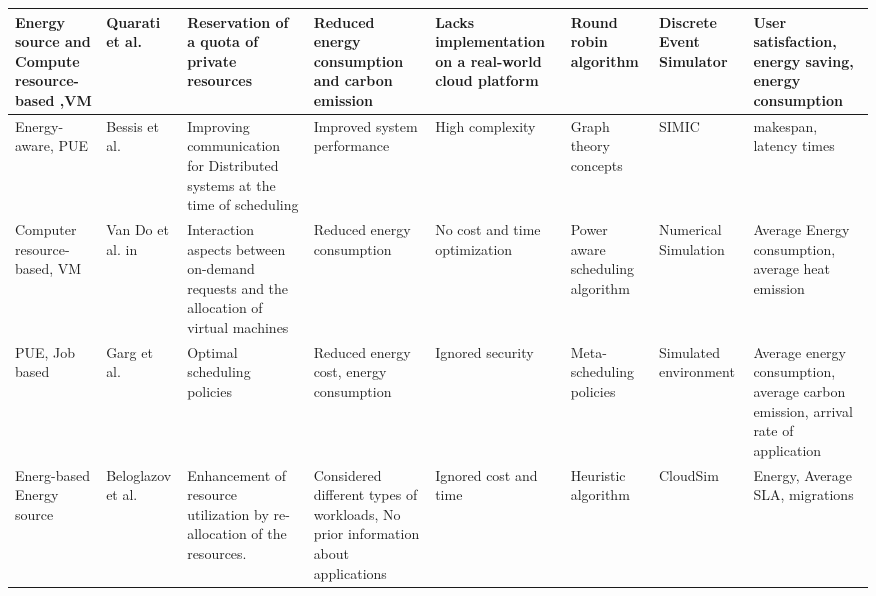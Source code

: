 \begin{sidewaystable*}[!htbp]
{\begin{tabular}{|g{2cm} p{1.5cm} p{2cm} p{2cm} p{2cm} p{2cm} p{2cm} p{2cm}|}
Energy source and  Compute resource-based ,VM  & Quarati et al.~\cite{quarati2013hybrid} &  Reservation of a quota of private resources & Reduced energy consumption and carbon emission & Lacks implementation on a real-world cloud platform & Round robin algorithm & Discrete Event Simulator & User satisfaction, energy saving, energy consumption
\\ \hline

Energy-aware, PUE & Bessis et al.~\cite{bessis2013using} & Improving communication for Distributed systems at the time of scheduling & Improved system performance & High complexity & Graph theory concepts & SIMIC & makespan, latency times 
\\ \hline 

Computer resource-based, VM & Van Do et al. in~\cite{van2012comparison} & Interaction aspects between on-demand requests and the allocation of virtual machines & Reduced energy consumption & No cost and time optimization & Power aware scheduling algorithm & Numerical Simulation & Average Energy consumption, average heat emission
\\ \hline

PUE, Job based & Garg et al.~\cite{garg2011environment} &  Optimal scheduling policies & Reduced energy cost, energy consumption & Ignored security & Meta-scheduling policies & Simulated environment  & Average energy consumption, average carbon emission, arrival rate of application 
 \\ \hline
 
Energ-based Energy source & Beloglazov et al.~\cite{beloglazov2010energy} &  Enhancement of resource utilization by re-allocation of the resources. & Considered different types of workloads, No prior information about applications & Ignored cost and time & Heuristic algorithm & CloudSim & Energy, Average SLA, migrations
\\ \hline

\end{tabular}
}
\end{sidewaystable*}
